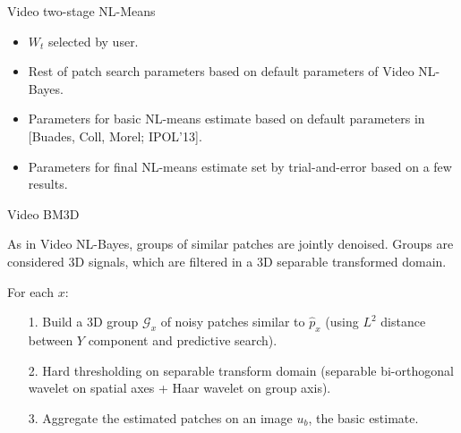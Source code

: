 \documentclass[mathserif]{beamer}
\makeatletter
\newcounter{multipleslide}
\newcommand{\multipleframe}{%
\setcounter{multipleslide}{\value{framenumber}}
\stepcounter{multipleslide}
\patchcmd{\beamer@@tmpl@footline}%
	{\insertframenumber}%
	{\themultipleslide}%
	{}%
	{}%
}
\makeatother
\begin{document}
\begin{frame}{Video two-stage NL-Means}

	\begin{itemize} \itemsep=.4cm
		\item $W_t$ selected by user.
		\item Rest of patch search parameters based on default parameters of
			Video NL-Bayes.
		\item Parameters for basic NL-means estimate based on default parameters
			in [Buades, Coll, Morel; IPOL'13]. 
		\item Parameters for final NL-means estimate set by trial-and-error based
			on a few results.
	\end{itemize}

	\vspace{1cm}

\end{frame}

\multipleframe
\begin{frame}{Video BM3D}

	As in Video NL-Bayes, groups of similar patches are jointly denoised. Groups
	are considered 3D signals, which are filtered in a 3D separable transformed
	domain.

	\vspace{.7cm}
	
	 For each $x$:

	\begin{enumerate}\itemsep=.5cm
		\item[1.] Build a 3D group $\mathcal G_x$ of noisy patches similar to
			$\hat p_x$ (using $L^2$ distance between $Y$ component and predictive
			search).
	
		\item[2.] Hard thresholding on separable transform domain (separable
			bi-orthogonal wavelet on spatial axes + Haar wavelet
			on group axis).

		\item[3.] Aggregate the estimated patches on an image $u_b$, the
			basic estimate.

	\end{enumerate}
	
\end{frame}
\end{document}
